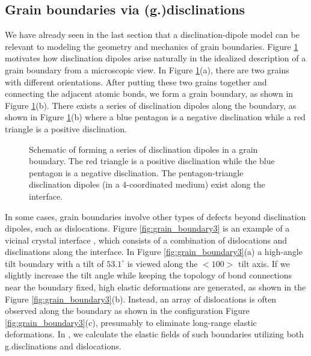 \documentclass[11pt,letterpaper]{article}
\begin{document}

\subsection{Grain boundaries via (g.)disclinations} \label{sec:disclination_grain_des}
We have already seen in the last section that a disclination-dipole model can be relevant to modeling the geometry and mechanics of grain boundaries.  Figure \ref{fig:grain_boundary2} motivates how disclination dipoles arise naturally in the idealized description  of a grain boundary from a microscopic view. In Figure \ref{fig:grain_boundary2}(a), there are two grains with different orientations. After putting these two grains together and connecting the adjacent atomic bonds, we form a grain boundary, as shown in Figure \ref{fig:grain_boundary2}(b). There exists a series of disclination dipoles along the boundary, as shown in Figure \ref{fig:grain_boundary2}(b) where a blue pentagon is a negative disclination while a red triangle is a positive disclination. 

\begin {figure}
\centering
{}\qquad
{}
\caption{Schematic of forming a series of disclination dipoles in a grain boundary. The red triangle is a positive disclination while the blue pentagon is a negative disclination. The pentagon-triangle disclination dipoles (in a 4-coordinated medium) exist along the interface.}\label{fig:grain_boundary2}
\end {figure}

In some cases, grain boundaries involve other types of defects beyond disclination dipoles, such as dislocations. Figure \ref{fig:grain_boundary3} is an example of a vicinal crystal interface \cite{balluffi2005kinetics}, which consists of a combination of dislocations  and disclinations along the interface. In Figure \ref{fig:grain_boundary3}(a) a high-angle tilt boundary with a tilt of $53.1^\circ$  is viewed along the $<100>$ tilt axis.  If we slightly increase the tilt angle while keeping the topology of bond connections near the boundary fixed,  high elastic deformations are generated, as shown in the Figure \ref{fig:grain_boundary3}(b). Instead, an array of dislocations is often observed along the boundary as shown in the configuration Figure \ref{fig:grain_boundary3}(c), presumably to eliminate long-range elastic deformations. In \cite{zhang_acharya_puri}, we calculate the elastic fields of such boundaries utilizing both g.disclinations and dislocations.
\end{document}
